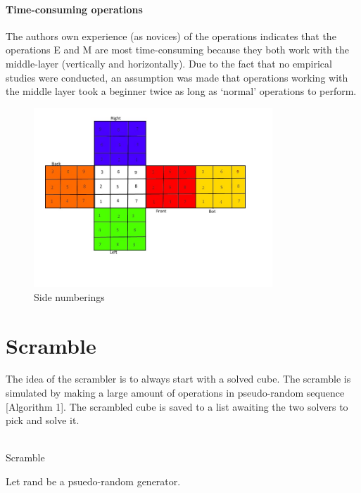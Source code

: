 \documentclass[a4paper,11pt]{kth-mag}
\begin{document}
\paragraph{Time-consuming operations}
The authors own experience (as novices) of the operations indicates that the operations E and M are most time-consuming because they both work with the middle-layer (vertically and horizontally).
Due to the fact that no empirical studies were conducted, an assumption was made that operations working with the middle layer took a beginner twice as long as `normal' operations to perform.

\begin{figure}[b]
	\centering
	\includegraphics[width= 0.8\textwidth]{figs/cubeorder.jpg}
	\caption{Side numberings}
	\label{fig_17}
\end{figure}  
\section{Scramble}
The idea of the scrambler is to always start with a solved cube. The scramble is simulated by making a large amount of operations in pseudo-random sequence [Algorithm 1]. The scrambled cube is saved to a list awaiting the two solvers to pick and solve it.\\\\
	\begin{algorithm}[H]
	\caption{Scramble}
	Let rand be a psuedo-random generator.\\

	\end{algorithm}
\end{document}
